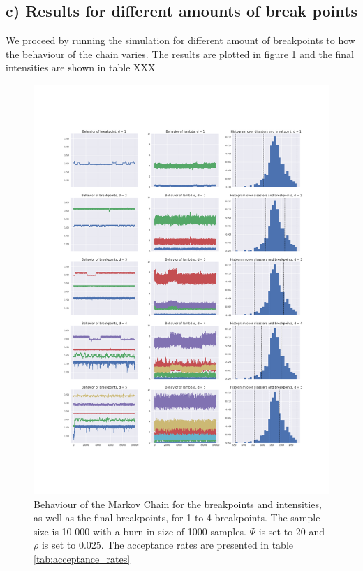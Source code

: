 \documentclass[a4paper]{article}
\begin{document}
\subsection*{c) Results for different amounts of break points}

We proceed by running the simulation for different amount of breakpoints to how the behaviour of the chain varies. The results are plotted in figure \ref{fig:num_breakpoints_results} and the final intensities are shown in table XXX

\begin{figure}[H]
    \centering
    \includegraphics[width = 1.0\textwidth]{images/chain_behavior.png} 
    \caption{Behaviour of the Markov Chain for the breakpoints and intensities, as well as the final breakpoints, for 1 to 4 breakpoints. The sample size is 10 000 with a burn in size of 1000 samples. $\Psi$ is set to $20$ and $\rho$ is set to $0.025$. The acceptance rates are presented in table \ref{tab:acceptance_rates}}
    \label{fig:num_breakpoints_results}
\end{figure}
\end{document}
